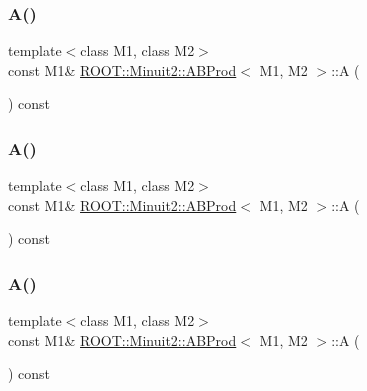 \subsubsection{\texorpdfstring{A()}{A()}\hspace{0.1cm}{\footnotesize\ttfamily [1/3]}}
{\footnotesize\ttfamily template$<$class M1, class M2$>$ \\
const M1\& \mbox{\hyperlink{classROOT_1_1Minuit2_1_1ABProd}{R\+O\+O\+T\+::\+Minuit2\+::\+A\+B\+Prod}}$<$ M1, M2 $>$\+::A (\begin{DoxyParamCaption}{ }\end{DoxyParamCaption}) const\hspace{0.3cm}{\ttfamily [inline]}}

\mbox{\label{classROOT_1_1Minuit2_1_1ABProd_a14f6ecd4f0a72010d6c2a8e7f2916cfa}} 
\subsubsection{\texorpdfstring{A()}{A()}\hspace{0.1cm}{\footnotesize\ttfamily [2/3]}}
{\footnotesize\ttfamily template$<$class M1, class M2$>$ \\
const M1\& \mbox{\hyperlink{classROOT_1_1Minuit2_1_1ABProd}{R\+O\+O\+T\+::\+Minuit2\+::\+A\+B\+Prod}}$<$ M1, M2 $>$\+::A (\begin{DoxyParamCaption}{ }\end{DoxyParamCaption}) const\hspace{0.3cm}{\ttfamily [inline]}}

\mbox{\label{classROOT_1_1Minuit2_1_1ABProd_a14f6ecd4f0a72010d6c2a8e7f2916cfa}} 
\subsubsection{\texorpdfstring{A()}{A()}\hspace{0.1cm}{\footnotesize\ttfamily [3/3]}}
{\footnotesize\ttfamily template$<$class M1, class M2$>$ \\
const M1\& \mbox{\hyperlink{classROOT_1_1Minuit2_1_1ABProd}{R\+O\+O\+T\+::\+Minuit2\+::\+A\+B\+Prod}}$<$ M1, M2 $>$\+::A (\begin{DoxyParamCaption}{ }\end{DoxyParamCaption}) const\hspace{0.3cm}{\ttfamily [inline]}}

